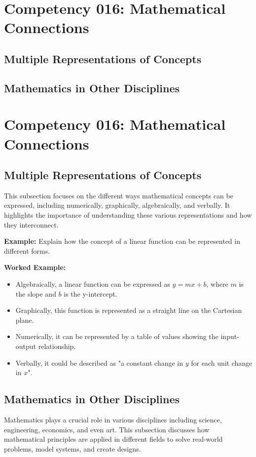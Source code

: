 \documentclass{book}
\begin{document}
\section{Competency 016: Mathematical Connections}
\subsection{Multiple Representations of Concepts}
\subsection{Mathematics in Other Disciplines}


\section{Competency 016: Mathematical Connections}


\subsection{Multiple Representations of Concepts}
This subsection focuses on the different ways mathematical concepts can be expressed, including numerically, graphically, algebraically, and verbally. It highlights the importance of understanding these various representations and how they interconnect.


\textbf{Example:} Explain how the concept of a linear function can be represented in different forms.


\textbf{Worked Example:}
\begin{itemize}
        \item Algebraically, a linear function can be expressed as \( y = mx + b \), where \( m \) is the slope and \( b \) is the y-intercept.
        \item Graphically, this function is represented as a straight line on the Cartesian plane.
        \item Numerically, it can be represented by a table of values showing the input-output relationship.
        \item Verbally, it could be described as "a constant change in \( y \) for each unit change in \( x \)".
\end{itemize}


\subsection{Mathematics in Other Disciplines}
Mathematics plays a crucial role in various disciplines including science, engineering, economics, and even art. This subsection discusses how mathematical principles are applied in different fields to solve real-world problems, model systems, and create designs.
\end{document}
